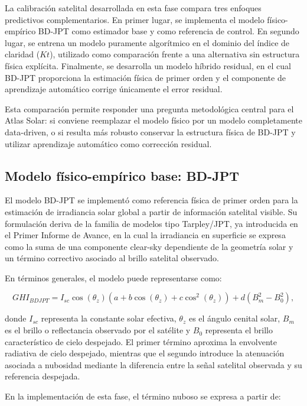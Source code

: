 \documentclass[../main.tex]{subfiles}
\begin{document}
La calibración satelital desarrollada en esta fase compara tres enfoques predictivos complementarios. En primer lugar, se implementa el modelo físico-empírico BD-JPT como estimador base y como referencia de control. En segundo lugar, se entrena un modelo puramente algorítmico en el dominio del índice de claridad ($Kt$), utilizado como comparación frente a una alternativa sin estructura física explícita. Finalmente, se desarrolla un modelo híbrido residual, en el cual BD-JPT proporciona la estimación física de primer orden y el componente de aprendizaje automático corrige únicamente el error residual.

Esta comparación permite responder una pregunta metodológica central para el Atlas Solar: si conviene reemplazar el modelo físico por un modelo completamente data-driven, o si resulta más robusto conservar la estructura física de BD-JPT y utilizar aprendizaje automático como corrección residual.

\subsection{Modelo físico-empírico base: BD-JPT}

El modelo BD-JPT se implementó como referencia física de primer orden para la estimación de irradiancia solar global a partir de información satelital visible. Su formulación deriva de la familia de modelos tipo Tarpley/JPT, ya introducida en el Primer Informe de Avance, en la cual la irradiancia en superficie se expresa como la suma de una componente clear-sky dependiente de la geometría solar y un término correctivo asociado al brillo satelital observado.

En términos generales, el modelo puede representarse como:

\begin{equation}
GHI_{BDJPT}
=
I_{sc}\cos(\theta_z)
\left(
a + b\cos(\theta_z) + c\cos^2(\theta_z)
\right)
+
d\left(B_m^2 - B_0^2\right),
\end{equation}

donde $I_{sc}$ representa la constante solar efectiva, $\theta_z$ es el ángulo cenital solar, $B_m$ es el brillo o reflectancia observado por el satélite y $B_0$ representa el brillo característico de cielo despejado. El primer término aproxima la envolvente radiativa de cielo despejado, mientras que el segundo introduce la atenuación asociada a nubosidad mediante la diferencia entre la señal satelital observada y su referencia despejada.

En la implementación de esta fase, el término nuboso se expresa a partir de:
\end{document}

